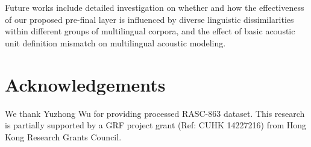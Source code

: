 \documentclass[a4paper]{article}
\begin{document}
Future works include detailed investigation on whether and how the effectiveness of our proposed pre-final layer is influenced by diverse linguistic dissimilarities within different groups of multilingual corpora, and the
effect of basic acoustic unit definition mismatch on multilingual acoustic modeling.


\section{Acknowledgements}
We thank Yuzhong Wu for providing processed RASC-863 dataset.
This research is partially supported by a GRF project grant (Ref: CUHK 14227216) from Hong Kong Research Grants Council.




\end{document}
